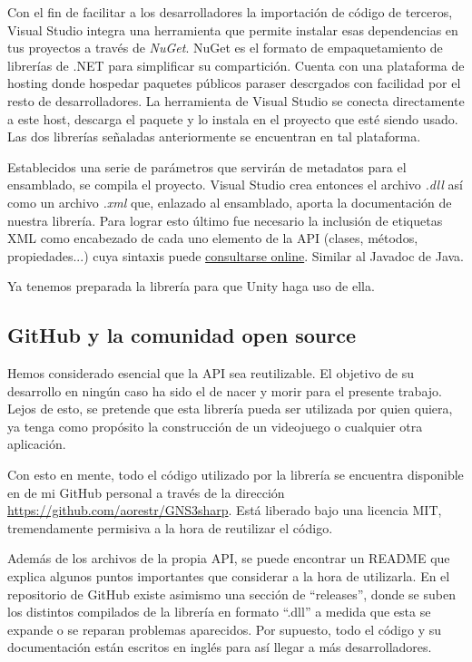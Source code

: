 Con el fin de facilitar a los desarrolladores la importación de código de terceros, Visual Studio integra una herramienta que permite instalar esas dependencias en tus proyectos a través de \textit{NuGet}. NuGet es el formato de empaquetamiento de librerías de .NET para simplificar su compartición. Cuenta con una plataforma de hosting donde hospedar paquetes públicos paraser descrgados con facilidad por el resto de desarrolladores. La herramienta de Visual Studio se conecta directamente a este host, descarga el paquete y lo instala en el proyecto que esté siendo usado. Las dos librerías señaladas anteriormente se encuentran en tal plataforma.

Establecidos una serie de parámetros que servirán de metadatos para el ensamblado, se compila el proyecto. Visual Studio crea entonces el archivo \textit{.dll} así como un archivo \textit{.xml} que, enlazado al ensamblado, aporta la documentación de nuestra librería. Para lograr esto último fue necesario la inclusión de etiquetas XML como encabezado de cada uno elemento de la API (clases, métodos, propiedades...) cuya sintaxis puede \href{https://docs.microsoft.com/en-us/dotnet/csharp/programming-guide/xmldoc/xml-documentation-comments}{consultarse online}. Similar al Javadoc de Java.

Ya tenemos preparada la librería para que Unity haga uso de ella.

\subsection{GitHub y la comunidad open source}
Hemos considerado esencial que la API sea reutilizable. El objetivo de su desarrollo en ningún caso ha sido el de nacer y morir para el presente trabajo. Lejos de esto, se pretende que esta librería pueda ser utilizada por quien quiera, ya tenga como propósito la construcción de un videojuego o cualquier otra aplicación.

Con esto en mente, todo el código utilizado por la librería se encuentra disponible en de mi GitHub personal a través de la dirección \url{https://github.com/aorestr/GNS3sharp}. Está liberado bajo una licencia MIT, tremendamente permisiva a la hora de reutilizar el código.

Además de los archivos de la propia API, se puede encontrar un README que explica algunos puntos importantes que considerar a la hora de utilizarla. En el repositorio de GitHub existe asimismo una sección de ``releases'', donde se suben los distintos compilados de la librería en formato ``.dll'' a medida que esta se expande o se reparan problemas aparecidos. Por supuesto, todo el código y su documentación están escritos en inglés para así llegar a más desarrolladores.


